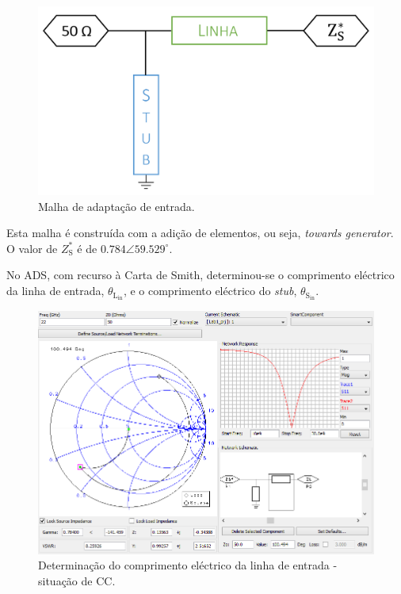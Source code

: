 \documentclass[11pt]{article}
\numberwithin{equation}{section}
\begin{document}
\begin{figure}[H]
	\centering
	\includegraphics[keepaspectratio=true, scale=0.25]{teoricas/malhaentrada}
	\vspace{-0.5em}
	\caption{Malha de adaptação de entrada.}
	\vspace{-0.8em}
\end{figure}

Esta malha é construída com a adição de elementos, ou seja, \textit{towards generator}. O valor de $Z_{\text{S}}^{*}$ é de $0.784\angle59.529 ^{\circ}$.

No ADS, com recurso à Carta de Smith, determinou-se o comprimento eléctrico da linha de entrada, $\theta_{\text{L}_{\text{in}}}$, e o comprimento eléctrico do \textit{stub}, $\theta_{\text{S}_{\text{in}}}$. 

\begin{figure}[H]
	\centering
	\includegraphics[keepaspectratio=true, scale=0.45]{exps/Gerador_cc_line}
	\vspace{-0.5em}
	\caption{Determinação do comprimento eléctrico da linha de entrada - situação de CC.}
	\vspace{-0.8em}
\end{figure}
\end{document}
